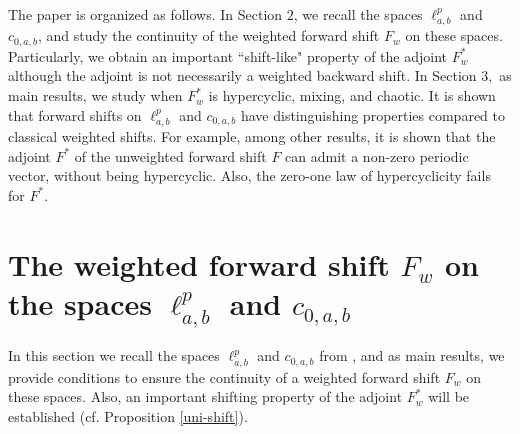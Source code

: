 \documentclass[12pt, reqno]{amsart}
\theoremstyle{definition}
\theoremstyle{remark}
\numberwithin{equation}{section}
\begin{document}
 

The paper is organized as follows. In Section $2$, we recall the spaces $\ell^p_{a,b}$ and $c_{0,a,b}$, and study the continuity of the weighted forward shift $F_w$ on these spaces. Particularly, we obtain an important ``shift-like" property of the adjoint $F_w^*$ although the adjoint is not necessarily a weighted backward shift. In Section $3,$ as main results, we study when $F_w^*$ is hypercyclic, mixing, and chaotic. It is shown that forward shifts on $\ell^p_{a,b}$ and $c_{0,a,b}$ have distinguishing properties compared to classical weighted shifts. For example, among other results, it is shown that the adjoint $F^*$ of the unweighted forward shift $F$ can admit a non-zero periodic vector, without being hypercyclic. Also, the zero-one law of hypercyclicity fails for $F^*$. 



\section{The weighted forward shift $F_w$ on the spaces $\ell^p_{a,b}$ and $c_{0,a,b}$}


In this section we recall the spaces $\ell^p_{a,b}$ and $c_{0,a,b}$ from \cite{Das-Mundayadan}, and as main results, we provide conditions to ensure the continuity of a weighted forward shift $F_w$ on these spaces. Also, an important shifting property of the adjoint $F_w^*$ will be established (cf. Proposition \ref{uni-shift}).
\end{document}

